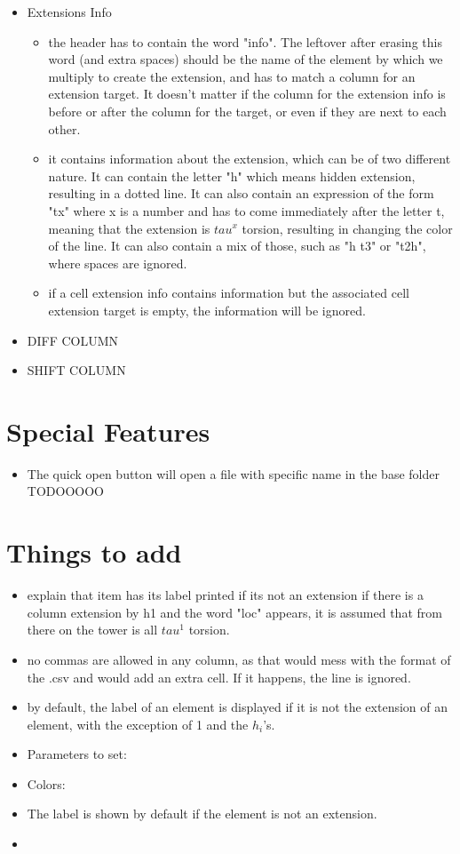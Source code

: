 \documentclass[a4paper,11pt]{article}
\begin{document}
\begin{itemize}
	
	\item{Extensions Info}
	\begin{itemize}
		\item the header has to contain the word "info". The leftover after erasing this word (and extra spaces) should be the name of the element by which we multiply to create the extension, and has to match a column for an extension target. It doesn't matter if the column for the extension info is before or after the column for the target, or even if they are next to each other.
		\item it contains information about the extension, which can be of two different nature. It can contain the letter "h" which means hidden extension, resulting in a dotted line. It can also contain an expression of the form "tx" where x is a number and has to come immediately after the letter t, meaning that the extension is $tau^x$ torsion, resulting in changing the color of the line. It can also contain a mix of those, such as "h t3" or "t2h", where spaces are ignored.
		\item if a cell extension info contains information but the associated cell extension target is empty, the information will be ignored.
	\end{itemize}
	\item{DIFF COLUMN}
	\item{SHIFT COLUMN}
\end{itemize}

\section{Special Features}
\begin{itemize}
\item The quick open button will open a file with specific name in the base folder TODOOOOO
\end{itemize}
	
\section{Things to add}
\begin{itemize}
\item explain that item has its label printed if its not an extension
if there is a column extension by h1 and the word "loc" appears, it is assumed that from there on the tower is all $tau^1$ torsion. 
\item no commas are allowed in any column, as that would mess with the format of the .csv and would add an extra cell. If it happens, the line is ignored.
\item by default, the label of an element is displayed if it is not the extension of an element, with the exception of 1 and the $h_i$'s.
	
\item Parameters to set:

\item Colors:
\item The label is shown by default if the element is not an extension. 
\item 
\end{itemize}
\end{document}
